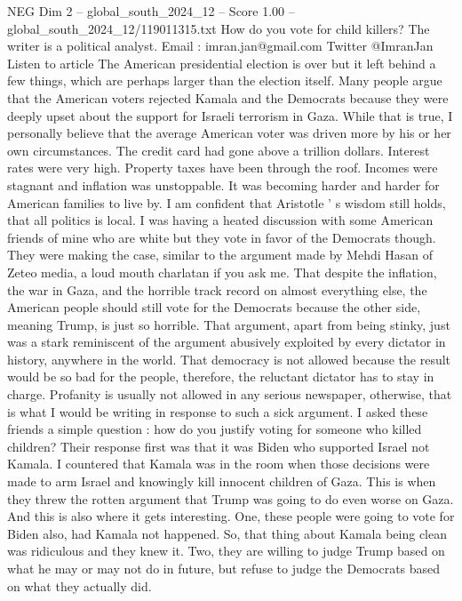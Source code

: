 \begin{textsample}{NEG Dim 2 – global\_south\_2024\_12 – Score 1.00 – global\_south\_2024\_12/119011315.txt}  \label{ex:f2_neg_243}
How do you vote for child killers?
The writer is a political analyst.
Email : imran.jan@gmail.com Twitter @ImranJan Listen to article The American presidential election is over but it left behind a few things, which are perhaps larger than the election itself.
Many people argue that the American voters rejected Kamala and the Democrats because they were deeply upset about the support for Israeli terrorism in Gaza.
While that is true, I personally believe that the average American voter was driven more by his or her own circumstances.
The credit card had gone above a trillion dollars.
Interest rates were very high.
Property taxes have been through the roof.
Incomes were stagnant and inflation was unstoppable.
It was becoming harder and harder for American families to live by.
I am confident that Aristotle ' s wisdom still holds, that all politics is local.
I was having a heated discussion with some American friends of mine who are white but they vote in favor of the Democrats though.
They were making the case, similar to the argument made by Mehdi Hasan of Zeteo media, a loud mouth charlatan if you ask me.
That despite the inflation, the war in Gaza, and the horrible track record on almost everything else, the American people should still vote for the Democrats because the other side, meaning Trump, is just so horrible.
That argument, apart from being stinky, just was a stark reminiscent of the argument abusively exploited by every dictator in history, anywhere in the world.
That democracy is not allowed because the result would be so bad for the people, therefore, the reluctant dictator has to stay in charge.
Profanity is usually not allowed in any serious newspaper, otherwise, that is what I would be writing in response to such a sick argument.
I asked these friends a simple question : how do you justify voting for someone who killed children?
Their response first was that it was Biden who supported Israel not Kamala.
I countered that Kamala was in the room when those decisions were made to arm Israel and knowingly kill innocent children of Gaza.
This is when they threw the rotten argument that Trump was going to do even worse on Gaza.
And this is also where it gets interesting.
One, these people were going to vote for Biden also, had Kamala not happened.
So, that thing about Kamala being clean was ridiculous and they knew it.
Two, they are willing to judge Trump based on what he may or may not do in future, but refuse to judge the Democrats based on what they actually did.

\end{textsample}
